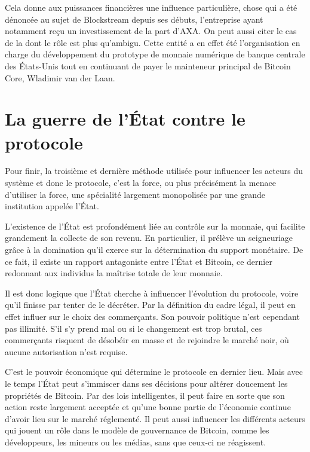 Cela donne aux puissances financières une influence particulière, chose qui a été dénoncée au sujet de Blockstream depuis ses débuts, l'entreprise ayant notamment reçu un investissement de la part d'AXA. On peut aussi citer le cas de la  dont le rôle est plus qu'ambigu. Cette entité a en effet été l'organisation en charge du développement du prototype de monnaie numérique de banque centrale des États-Unis tout en continuant de payer le mainteneur principal de Bitcoin Core, Wladimir van der Laan.

\section*{La guerre de l'État contre le protocole} %

Pour finir, la troisième et dernière méthode utilisée pour influencer les acteurs du système et donc le protocole, c'est la force, ou plus précisément la menace d'utiliser la force, une spécialité largement monopolisée par une grande institution appelée l'État.

L'existence de l'État est profondément liée au contrôle sur la monnaie, qui facilite grandement la collecte de son revenu. En particulier, il prélève un seigneuriage grâce à la domination qu'il exerce sur la détermination du support monétaire. De ce fait, il existe un rapport antagoniste entre l'État et Bitcoin, ce dernier redonnant aux individus la maîtrise totale de leur monnaie. %

Il est donc logique que l'État cherche à influencer l'évolution du protocole, voire qu'il finisse par tenter de le décréter. Par la définition du cadre légal, il peut en effet influer sur le choix des commerçants. Son pouvoir politique n'est cependant pas illimité. S'il s'y prend mal ou si le changement est trop brutal, ces commerçants risquent de désobéir en masse et de rejoindre le marché noir, où aucune autorisation n'est requise.

C'est le pouvoir économique qui détermine le protocole en dernier lieu. Mais avec le temps l'État peut s'immiscer dans ses décisions pour altérer doucement les propriétés de Bitcoin. Par des lois intelligentes, il peut faire en sorte que son action reste largement acceptée et qu'une bonne partie de l'économie continue d'avoir lieu sur le marché réglementé. Il peut aussi influencer les différents acteurs qui jouent un rôle dans le modèle de gouvernance de Bitcoin, comme les développeurs, les mineurs ou les médias, sans que ceux-ci ne réagissent.

